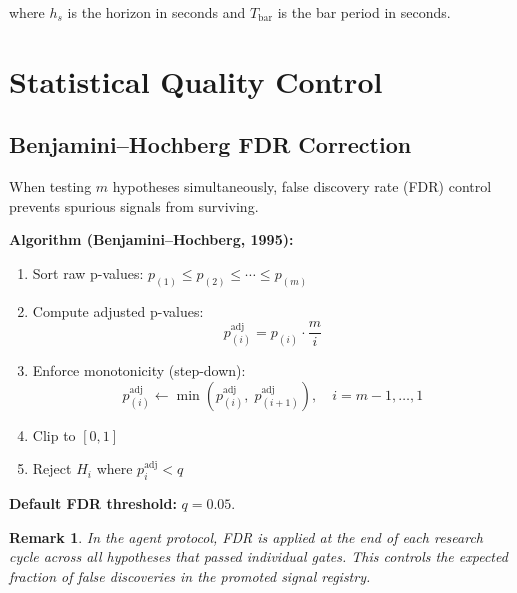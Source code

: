 \documentclass[11pt,a4paper]{article}
\newtheorem{remark}{Remark}
\begin{document}
where $h_s$ is the horizon in seconds and $T_{\mathrm{bar}}$ is the bar
period in seconds.

\section{Statistical Quality Control}

\subsection{Benjamini--Hochberg FDR Correction}

When testing $m$ hypotheses simultaneously, false discovery rate (FDR)
control prevents spurious signals from surviving.

\textbf{Algorithm (Benjamini--Hochberg, 1995):}
\begin{enumerate}    \item Sort raw p-values: $p_{(1)} \leq p_{(2)} \leq \cdots \leq p_{(m)}$
    \item Compute adjusted p-values:
        \begin{equation}
            p_{(i)}^{\mathrm{adj}} = p_{(i)} \cdot \frac{m}{i}
            \label{eq:bh_adjust}
        \end{equation}
    \item Enforce monotonicity (step-down):
        \begin{equation}
            p_{(i)}^{\mathrm{adj}} \leftarrow
                \min\!\left(p_{(i)}^{\mathrm{adj}},\;
                p_{(i+1)}^{\mathrm{adj}}\right),
            \quad i = m-1, \ldots, 1
            \label{eq:bh_monotone}
        \end{equation}
    \item Clip to $[0, 1]$
    \item Reject $H_i$ where $p_i^{\mathrm{adj}} < q$
\end{enumerate}

\textbf{Default FDR threshold:} $q = 0.05$.

\begin{remark}
In the agent protocol, FDR is applied at the end of each research cycle
across all hypotheses that passed individual gates. This controls the
expected fraction of false discoveries in the promoted signal registry.
\end{remark}
\end{document}
